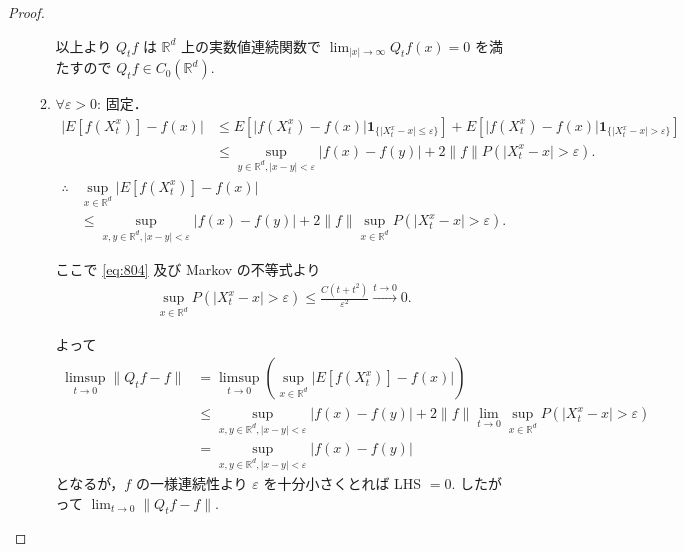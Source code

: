 \documentclass{jsarticle}
\begin{document}
\begin{proof}
\begin{enumerate}[label=(\arabic*)]
\begin{enumerate}[label=(\roman*)]
            以上より $Q_{t}f$ は $\mathbb{R}^d$ 上の実数値連続関数で $\lim_{\lvert x\rvert\to\infty}Q_{t}f(x)=0$ を満たすので $Q_{t}f\in C_{0}(\mathbb{R}^d).$
                
            \item
            $\forall \varepsilon>0$: 固定．
            \begin{align}
                \lvert E[f(X_{t}^{x})]-f(x)\rvert
                &\le E[\lvert f(X_{t}^{x})-f(x)\rvert\bm{1}_{\{\lvert X_{t}^{x}-x\rvert\le \varepsilon\}}]
                + E[\lvert f(X_{t}^{x})-f(x)\rvert\bm{1}_{\{\lvert X_{t}^{x}-x\rvert>\varepsilon\}}] \\
                &\le \sup_{y\in\mathbb{R}^d, \lvert x-y\rvert<\varepsilon}\lvert f(x)-f(y)\rvert
                + 2\lVert f\rVert P(\lvert X_{t}^{x}-x\rvert>\varepsilon).
            \end{align}
            \begin{align}
                \therefore 
                &\sup_{x\in\mathbb{R}^d}\lvert E[f(X_{t}^{x})]-f(x)\rvert \\
                &\le \sup_{x, y\in\mathbb{R}^d, \lvert x-y\rvert<\varepsilon}\lvert f(x)-f(y)\rvert
                + 2\lVert f\rVert\sup_{x\in\mathbb{R}^d} P(\lvert X_{t}^{x}-x\rvert>\varepsilon).
            \end{align}

            ここで \eqref{eq:804} 及び Markov の不等式より
            \begin{align}
                \sup_{x\in\mathbb{R}^d}P(\lvert X_{t}^{x}-x\rvert>\varepsilon)
                \le \frac{C(t+t^2)}{\varepsilon^2}\xrightarrow{t\to0}0.
            \end{align}

            よって
            \begin{align}
                \limsup_{t\to0}\lVert Q_{t}f-f\rVert
                &= \limsup_{t\to0}(\sup_{x\in\mathbb{R}^d}\lvert E[f(X_{t}^{x})]-f(x)\rvert) \\
                &\le \sup_{x, y\in\mathbb{R}^d, \lvert x-y\rvert<\varepsilon}\lvert f(x)-f(y)\rvert
                + 2\lVert f\rVert\lim_{t\to0}\sup_{x\in\mathbb{R}^d}P(\lvert X_{t}^{x}-x\rvert>\varepsilon) \\
                &= \sup_{x, y\in\mathbb{R}^d, \lvert x-y\rvert<\varepsilon}\lvert f(x)-f(y)\rvert
            \end{align}
            となるが，$f$ の一様連続性より $\varepsilon$ を十分小さくとれば LHS $=0.$
            したがって $\lim_{t\to0}\lVert Q_{t}f-f\rVert.$
        \end{enumerate}


\end{enumerate}
\end{proof}
\end{document}
